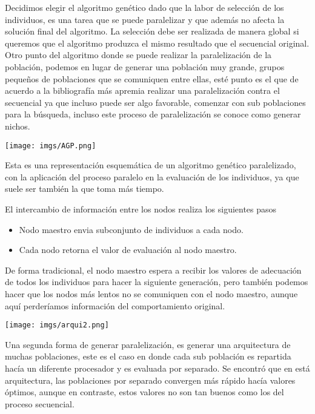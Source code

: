 \documentclass{article}
\begin{document}
Decidimos elegir el algoritmo genético dado que la labor de selección de los individuos, es una tarea que se puede paralelizar y que además no afecta la solución final del algoritmo. La selección debe ser realizada de manera global si queremos que el algoritmo produzca el mismo resultado que el secuencial original. Otro punto del algoritmo donde se puede realizar la paralelización de la población, podemos en lugar de generar una población muy grande, grupos pequeños de poblaciones que se comuniquen entre ellas, esté punto es el que de acuerdo a la bibliografía más apremia realizar una paralelización contra el secuencial ya que incluso puede ser algo favorable, comenzar con sub poblaciones para la búsqueda, incluso este proceso de paralelización se conoce como generar nichos.
\begin{center}
\texttt{[image: imgs/AGP.png]}    
\end{center}
Esta es una representación esquemática de un algoritmo genético paralelizado, con la aplicación del proceso paralelo en la evaluación de los individuos, ya que suele ser también la que toma más tiempo. 

    El intercambio de información entre los nodos 
realiza los siguientes pasos
\begin{itemize}
    \item Nodo maestro envia subconjunto de individuos a cada nodo. 
    \item Cada nodo retorna el valor de evaluación al nodo maestro.
    
\end{itemize}
De forma tradicional, el nodo maestro espera a recibir los valores de adecuación de todos los individuos para hacer la siguiente generación, pero también podemos hacer que los nodos más lentos no se comuniquen con el nodo maestro, aunque aquí perderíamos información del comportamiento original.

\begin{center}
\texttt{[image: imgs/arqui2.png]}    
\end{center}

Una segunda forma de generar paralelización, es generar una arquitectura de muchas poblaciones, este es el caso en donde cada sub población es repartida hacía un diferente procesador y es evaluada por separado. Se encontró que en está arquitectura, las poblaciones por separado convergen más rápido hacía valores óptimos, aunque en contraste, estos valores no son tan buenos como los del proceso secuencial.
\end{document}
